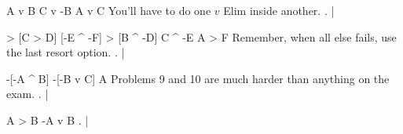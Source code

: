 \argument
 A v B
 C v -B
\argumentline
 A v C
\endargument
\Hint You'll have to do one $v$ Elim inside another.
	\answer
	. | 
	\endfitchproof
	\endanswer

\resetfitchsetup
{}
\argument
 [A ^ B] > [C > D]
 [-E ^ -F] > [B ^ -D]
 C ^ -E
\argumentline
 A > F
\endargument
\Hint Remember, when all else fails, use the last resort option.
	\answer
	. | 
	\endfitchproof
	\endanswer

\argument
 -[-A ^ B]
 -[-B v C]
\argumentline
 A
\endargument
\Hint Problems 9 and 10 are much harder than anything on the exam.
	\answer
	. | 
	\endfitchproof
	\endanswer

\argument
 A > B
\argumentline
 -A v B
\endargument
	\answer
	. | 
	\endfitchproof
	\endanswer

\endproblems
\bye
